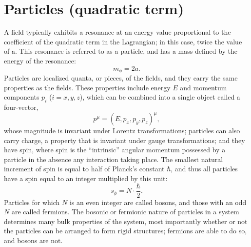 \section{Particles (quadratic term)}
A field typically exhibits a resonance at an energy value proportional to the coefficient of the quadratic term in the Lagrangian; in this case, twice the value of a. This resonance is referred to as a particle, and has a mass defined by the energy of the resonance:
\begin{equation}
m_{\phi} = 2a.
\end{equation}
Particles are localized quanta, or pieces, of the fields, and they carry the same properties as the fields. These properties include energy $E$ and momentum components $p_i$ ($i=x,y,z$), which can be combined into a single object called a four-vector,
\begin{equation} 
p^\mu=(E,p_x,p_y,p_z)^\mu,
\end{equation}
whose magnitude is invariant under Lorentz transformations; particles can also carry charge, a property that is invariant under gauge transformations; and they have spin, where spin is the ``intrinsic'' angular momentum possessed by a particle in the absence any interaction taking place. The smallest natural increment of spin is equal to half of Planck's constant $\hbar$, and thus all particles have a spin equal to an integer multiplied by this unit:
\begin{equation}
s_\phi = N\cdot \frac{\hbar}{2}.
\end{equation}
Particles for which $N$ is an even integer are called bosons, and those with an odd $N$ are called fermions. The bosonic or fermionic nature of particles in a system determines many bulk properties of the system, most importantly whether or not the particles can be arranged to form rigid structures; fermions are able to do so, and bosons are not.

